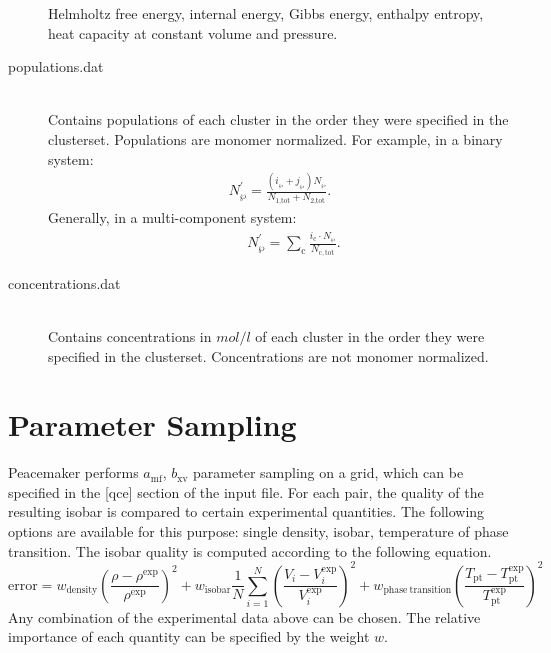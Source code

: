 \documentclass{scrartcl}
\newcommand{\amf}{a_\mathrm{mf}}
\newcommand{\bxv}{b_\mathrm{xv}}
\begin{document}
\begin{description}
        Helmholtz free energy, internal energy, Gibbs energy, enthalpy entropy, heat capacity at constant volume and pressure.
        \vspace{0.1cm}
    \item[populations.dat] \hfill \\
        Contains populations of each cluster in the order they were specified in the clusterset.
        Populations are monomer normalized.
        For example, in a binary system:
        \begin{align}
        N^\prime_\wp = \frac{\left(i_\wp+j_\wp\right)N_\wp}{N_\text{1,tot} + N_\text{2,tot}}.
        \end{align}
        Generally, in a multi-component system:
        \begin{align}
        \qquad N^\prime_\wp = \sum_\mathrm{c} \frac{i_\mathrm{c} \cdot N_\wp}{N_\mathrm{c,tot}}.
        \end{align}
        \vspace{0.1cm}
    \item[concentrations.dat] \hfill \\
        Contains concentrations in $\si{mol/l}$ of each cluster in the order they were specified in the clusterset.
        Concentrations are not monomer normalized.
\end{description}

\section{Parameter Sampling}
\label{sec:sampling}

Peacemaker performs $\amf$, $\bxv$ parameter sampling on a grid, which can be specified in the [qce] 
section of the input file.
For each pair, the quality of the resulting isobar is compared to certain experimental quantities.
The following options are available for this purpose: single density, isobar, temperature of phase transition.
The isobar quality is computed according to the following equation.
\begin{equation*}
    \mathrm{error} = w_\mathrm{density}                                      {\left(\frac{\rho - \rho^\mathrm{exp}}{\rho^\mathrm{exp}}\right)}^2
                   + w_\mathrm{isobar}            \frac{1}{N} \sum_{i=1}^{N} {\left(\frac{V_i - V_i^\mathrm{exp}}{V_i^\mathrm{exp}}\right)}^2
                   + w_\mathrm{phase\ transition}                            {\left(\frac{T_\mathrm{pt}-T_\mathrm{pt}^\mathrm{exp}}{T_\mathrm{pt}^\mathrm{exp}}\right)}^2
\end{equation*}
Any combination of the experimental data above can be chosen.
The relative importance of each quantity can be specified by the weight $w$.
\end{document}
